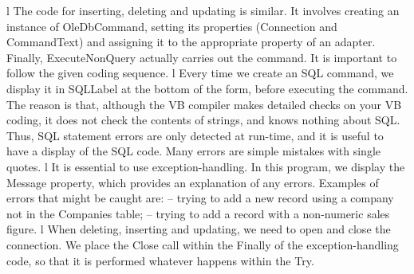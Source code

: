 l	The code for inserting, deleting and updating is similar. It involves creating an instance of OleDbCommand, setting its properties (Connection and CommandText) and assigning it to the appropriate property of an adapter. Finally, ExecuteNonQuery 
	actually carries out the command. It is important to follow the given coding sequence.
l	Every time we create an SQL command, we display it in SQLLabel at the bottom 
of the form, before executing the command. The reason is that, although the VB compiler makes detailed checks on your VB coding, it does not check the contents of strings, and knows nothing about SQL. Thus, SQL statement errors are only detected at run-time, and it is useful to have a display of the SQL code. Many errors are simple mistakes with single quotes.
l	It is essential to use exception-handling. In this program, we display the Message property, which provides an explanation of any errors. Examples of errors that might be caught are:
	–	trying to add a new record using a company not in the Companies table;
	–	trying to add a record with a non-numeric sales ﬁgure.
l	When deleting, inserting and updating, we need to open and close the connection. We place the Close call within the Finally of the exception-handling code, so that it is performed whatever happens within the Try.

